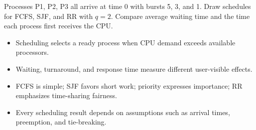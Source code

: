 \begin{tryit}
Processes P1, P2, P3 all arrive at time 0 with bursts 5, 3, and 1. Draw schedules for FCFS, SJF, and RR with $q=2$. Compare average waiting time and the time each process first receives the CPU.
\end{tryit}





\begin{chapterrecap}
\begin{itemize}
  \item Scheduling selects a ready process when CPU demand exceeds available processors.
  \item Waiting, turnaround, and response time measure different user-visible effects.
  \item FCFS is simple; SJF favors short work; priority expresses importance; RR emphasizes time-sharing fairness.
  \item Every scheduling result depends on assumptions such as arrival times, preemption, and tie-breaking.
\end{itemize}
\end{chapterrecap}
